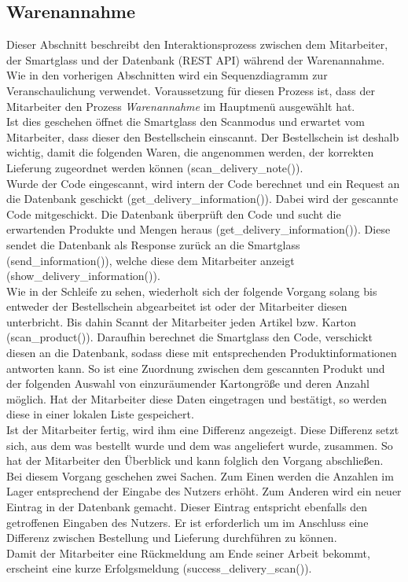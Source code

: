 \subsection{Warenannahme}
Dieser Abschnitt beschreibt den Interaktionsprozess zwischen dem Mitarbeiter, der Smartglass und der Datenbank (REST API) während der Warenannahme. Wie in den vorherigen Abschnitten wird ein Sequenzdiagramm zur Veranschaulichung verwendet. Voraussetzung für diesen Prozess ist, dass der Mitarbeiter den Prozess \textit{Warenannahme} im Hauptmenü ausgewählt hat. 
\\
Ist dies geschehen öffnet die Smartglass den Scanmodus und erwartet vom Mitarbeiter, dass dieser den Bestellschein einscannt. Der Bestellschein ist deshalb wichtig, damit die folgenden Waren, die angenommen werden, der korrekten Lieferung zugeordnet werden können (scan\_delivery\_note()). 
\\
Wurde der Code eingescannt, wird intern der Code berechnet und ein Request an die Datenbank geschickt (get\_delivery\_information()). Dabei wird der gescannte Code mitgeschickt. Die Datenbank überprüft den Code und sucht die erwartenden Produkte und Mengen heraus (get\_delivery\_information()). Diese sendet die Datenbank als Response zurück an die Smartglass (send\_information()), welche diese dem Mitarbeiter anzeigt (show\_delivery\_information()).
\\
Wie in der Schleife zu sehen, wiederholt sich der folgende Vorgang solang bis entweder der Bestellschein abgearbeitet ist oder der Mitarbeiter diesen unterbricht. Bis dahin Scannt der Mitarbeiter jeden Artikel bzw. Karton (scan\_product()). Daraufhin berechnet die Smartglass den Code, verschickt diesen an die Datenbank, sodass diese mit entsprechenden Produktinformationen antworten kann. So ist eine Zuordnung zwischen dem gescannten Produkt und der folgenden Auswahl von einzuräumender Kartongröße und deren Anzahl möglich. Hat der Mitarbeiter diese Daten eingetragen und bestätigt, so werden diese in einer lokalen Liste gespeichert. \\
Ist der Mitarbeiter fertig, wird ihm eine Differenz angezeigt. Diese Differenz setzt sich, aus dem was bestellt wurde und dem was angeliefert wurde, zusammen. So hat der Mitarbeiter den Überblick und kann folglich den Vorgang abschließen. \\
Bei diesem Vorgang geschehen zwei Sachen. Zum Einen werden die Anzahlen im Lager entsprechend der Eingabe des Nutzers erhöht. Zum Anderen wird ein neuer Eintrag in der Datenbank gemacht. Dieser Eintrag entspricht ebenfalls den getroffenen Eingaben des Nutzers. Er ist erforderlich um im Anschluss eine Differenz zwischen Bestellung und Lieferung durchführen zu können.\\
Damit der Mitarbeiter eine Rückmeldung am Ende seiner Arbeit bekommt, erscheint eine kurze Erfolgsmeldung (success\_delivery\_scan()).

